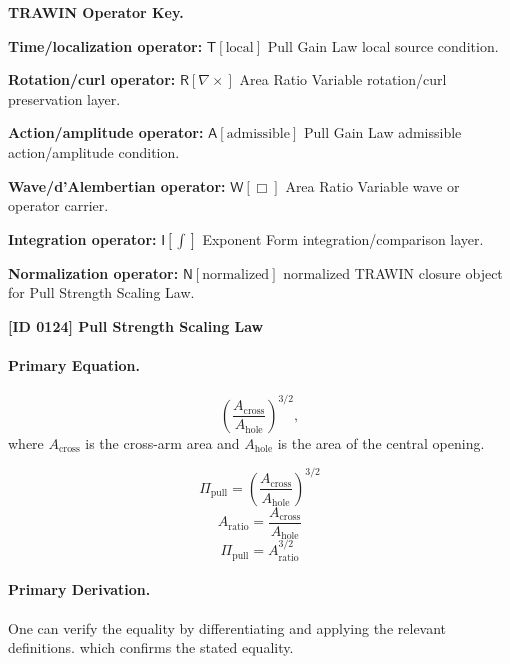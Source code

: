\par\vspace{0.45\baselineskip}
\noindent\begin{minipage}[t]{\linewidth}
\begingroup
\small
\raggedright
\textbf{TRAWIN Operator Key.}\par
\noindent\textbf{Time/localization operator:} $\mathsf{T}\!\left[\mathrm{local}\right]$ Pull Gain Law local source condition.\par
\noindent\textbf{Rotation/curl operator:} $\mathsf{R}\!\left[\nabla\times\right]$ Area Ratio Variable rotation/curl preservation layer.\par
\noindent\textbf{Action/amplitude operator:} $\mathsf{A}\!\left[\mathrm{admissible}\right]$ Pull Gain Law admissible action/amplitude condition.\par
\noindent\textbf{Wave/d'Alembertian operator:} $\mathsf{W}\!\left[\Box\right]$ Area Ratio Variable wave or operator carrier.\par
\noindent\textbf{Integration operator:} $\mathsf{I}\!\left[\int\right]$ Exponent Form integration/comparison layer.\par
\noindent\textbf{Normalization operator:} $\mathsf{N}\!\left[\mathrm{normalized}\right]$ normalized TRAWIN closure object for Pull Strength Scaling Law.\par
\endgroup
\end{minipage}

\clearpage
\noindent\textbf{[ID 0124] Pull Strength Scaling Law}\par
\vspace{0.35em}
\paragraph{Primary Equation.}
\[ \left(\frac{A_{\mathrm{cross}}}{A_{\mathrm{hole}}}\right)^{3/2}, \] where $A_{\mathrm{cross}}$ is the cross-arm area and $A_{\mathrm{hole}}$ is the area of the central opening.

\[
\Pi_{\mathrm{pull}} = \left(\frac{A_{\mathrm{cross}}}{A_{\mathrm{hole}}}\right)^{3/2}
\]
\[
A_{\mathrm{ratio}} = \frac{A_{\mathrm{cross}}}{A_{\mathrm{hole}}}
\]
\[
\Pi_{\mathrm{pull}} = A_{\mathrm{ratio}}^{3/2}
\]

\paragraph{Primary Derivation.}
One can verify the equality by differentiating and applying the relevant definitions. which confirms the stated equality.
